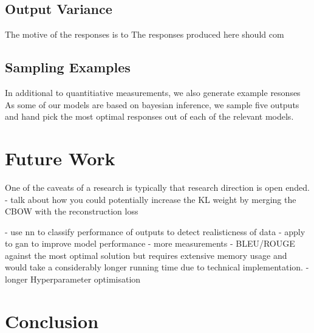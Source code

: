 \documentclass[12pt,twoside]{report}
\begin{document}

\section{Output Variance}

The motive of the responses is to 
The responses produced here should com

\section{Sampling Examples}

In additional to quantitiative measurements, we also generate example resonses 
As some of our models are based on bayesian inference, we sample five outputs and hand pick the most optimal responses out of each of the relevant models. 

\chapter{Future Work}

One of the caveats of a research is typically that research direction is open ended. 
- talk about how you could potentially increase the KL weight by merging the CBOW with the reconstruction loss

- use nn to classify performance of outputs to detect realisticness of data
- apply to gan to improve model performance
- more measurements
- BLEU/ROUGE against the most optimal solution but requires extensive memory usage and would take a considerably longer running time due to technical implementation.
- longer Hyperparameter optimisation

\chapter{Conclusion}

\end{document}
